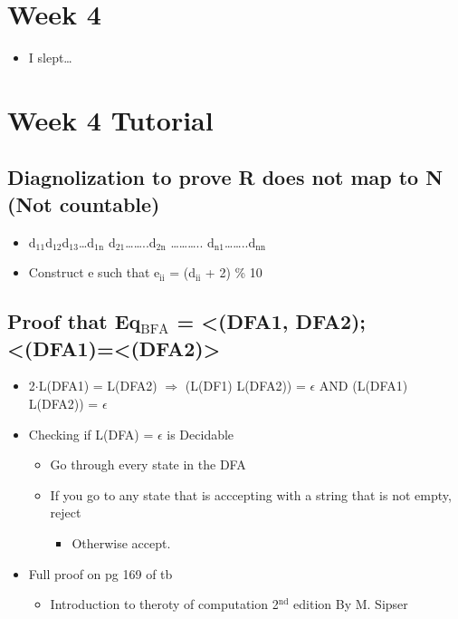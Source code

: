 \documentclass[11pt]{article}
\begin{document}
\section{Week 4}
\label{sec:orga312c06}
\begin{itemize}
\item I slept\ldots{}
\end{itemize}
\section{Week 4 Tutorial}
\label{sec:org1bd9600}
\subsection{Diagnolization to prove R does not map to N (Not countable)}
\label{sec:org705afeb}
\begin{itemize}
\item d\(_{\text{11}}\)d\(_{\text{12}}\)d\(_{\text{13}}\)\ldots{}d\(_{\text{1n}}\)
d\(_{\text{21}}\)\ldots{}\ldots{}..d\(_{\text{2n}}\)
\ldots{}\ldots{}\ldots{}..
d\(_{\text{n1}}\)\ldots{}\ldots{}..d\(_{\text{nn}}\)
\item Construct e such that e\(_{\text{ii}}\) = (d\(_{\text{ii}}\) + 2) \% 10
\end{itemize}
\subsection{Proof that Eq\(_{\text{BFA}}\) = <(DFA1, DFA2); <(DFA1)=<(DFA2)>}
\label{sec:org09f4b57}
\begin{itemize}
\item 2\(\cdot\)L(DFA1) = L(DFA2) \(\Rightarrow\) (L(DF1) \intersect L(DFA2)) = \(\epsilon\)
AND (L(DFA1) \intersect L(DFA2)) = \(\epsilon\)
\item Checking if L(DFA) = \(\epsilon\) is Decidable
\begin{itemize}
\item Go through every state in the DFA
\item If you go to any state that is acccepting with a string that is not empty, reject
\begin{itemize}
\item Otherwise accept.
\end{itemize}
\end{itemize}
\item Full proof on pg 169 of tb
\begin{itemize}
\item Introduction to theroty of computation 2\(^{\text{nd}}\) edition By M. Sipser
\end{itemize}
\end{itemize}
\end{document}
